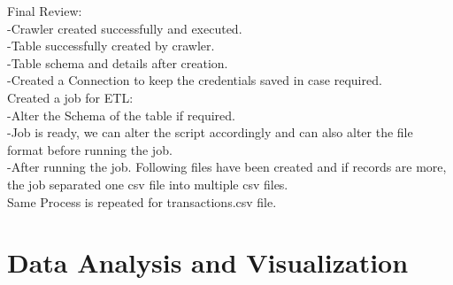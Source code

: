 \documentclass[11pt,journal,compsoc]{IEEEtran}
\begin{document}
Final Review: \\
-Crawler created successfully and executed. \\
-Table successfully created by crawler. \\
-Table schema and details after creation. \\
-Created a Connection to keep the credentials saved in case required. \\

Created a job for ETL: \\
-Alter the Schema of the table if required. \\
-Job is ready, we can alter the script accordingly and can also alter the file format before running the job. \\
-After running the job. Following files have been created and if records are more, the job separated one csv file into multiple csv files. \\

Same Process is repeated for transactions.csv file. \\

\section{Data Analysis and Visualization}
\end{document}
